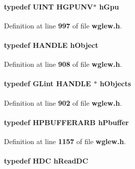 \paragraph[{h\+Gpu}]{\setlength{\rightskip}{0pt plus 5cm}typedef {\bf U\+I\+NT} H\+G\+P\+U\+NV$\ast$ {\bf h\+Gpu}}\label{wglew_8h_aed4a6a9f2b563a76ae9fa1bb8721d09b}


Definition at line {\bf 997} of file {\bf wglew.\+h}.

\paragraph[{h\+Object}]{\setlength{\rightskip}{0pt plus 5cm}typedef {\bf H\+A\+N\+D\+LE} {\bf h\+Object}}\label{wglew_8h_aa5a5fe2b63fcd8a600867982bb851ad9}


Definition at line {\bf 908} of file {\bf wglew.\+h}.

\paragraph[{h\+Objects}]{\setlength{\rightskip}{0pt plus 5cm}typedef {\bf G\+Lint} {\bf H\+A\+N\+D\+LE} $\ast$ {\bf h\+Objects}}\label{wglew_8h_a7570bc8e66ab8b493ac26343e360db2f}


Definition at line {\bf 902} of file {\bf wglew.\+h}.

\paragraph[{h\+Pbuffer}]{\setlength{\rightskip}{0pt plus 5cm}typedef {\bf H\+P\+B\+U\+F\+F\+E\+R\+A\+RB} {\bf h\+Pbuffer}}\label{wglew_8h_a7933788375ff3cd41e28997678f1930d}


Definition at line {\bf 1157} of file {\bf wglew.\+h}.

\paragraph[{h\+Read\+DC}]{\setlength{\rightskip}{0pt plus 5cm}typedef {\bf H\+DC} {\bf h\+Read\+DC}}\label{wglew_8h_afd88903d22347d0a98a2e56b97352816}


